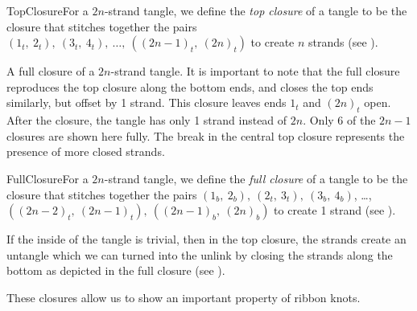 \begin{paper}
\begin{paperdef}{TopClosure}{For a $2n$-strand tangle, we define the
\textit{top closure} of a tangle to be the closure that stitches together the
pairs $(1_t,~2_t),~(3_t,~4_t),~\dots,~((2n-1)_t,~(2n)_t)$ to create
$n$ strands (see \figTop).}\end{paperdef}

{A full closure of a $2n$-strand tangle.
It is important to note that the full closure reproduces the top closure along
the bottom ends, and closes the top ends similarly, but offset by 1 strand.
This closure leaves ends $1_t$ and $(2n)_t$ open.
After the closure, the tangle has only 1 strand instead of $2n$.
Only 6 of the $2n-1$ closures are shown here fully.
The break in the central top closure represents the presence of more closed
strands.}

\begin{paperdef}{FullClosure}{For a $2n$-strand tangle, we define the
\textit{full closure} of a tangle to be the closure that stitches together the
pairs $(1_b,~2_b),~(2_t,~3_t),~(3_b,~4_b)$, \dots,
$((2n-2)_t,~(2n-1)_t),~((2n-1)_b,~(2n)_b)$ to create 1 strand (see
\figFull).}\end{paperdef}

If the inside of the tangle is trivial, then in the top closure, the strands
create an untangle which we can turned into the unlink by closing the strands
along the bottom as depicted in the full closure (see \figFull).

These closures allow us to show an important property of ribbon knots.


\end{paper}
